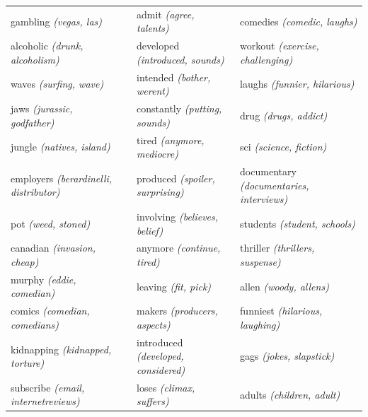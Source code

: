 \begin{landscape}
\begin{table}[]
\begin{tabular}{llll}
			gambling \textit{(vegas, las)}                 &                          & admit \textit{(agree, talents)}                  & comedies \textit{(comedic, laughs)}              \\
			alcoholic \textit{(drunk, alcoholism)}         &                          & developed \textit{(introduced, sounds)}          & workout \textit{(exercise, challenging)}         \\
			waves \textit{(surfing, wave)}                 &                          & intended \textit{(bother, werent)}               & laughs \textit{(funnier, hilarious)}             \\
			jaws \textit{(jurassic, godfather)}            &                          & constantly \textit{(putting, sounds)}            & drug \textit{(drugs, addict)}                    \\
			jungle \textit{(natives, island)}              &                          & tired \textit{(anymore, mediocre)}               & sci \textit{(science, fiction)}                  \\
			employers \textit{(berardinelli, distributor)} &                          & produced \textit{(spoiler, surprising)}          & documentary \textit{(documentaries, interviews)} \\
			pot \textit{(weed, stoned)}                    &                          & involving \textit{(believes, belief)}            & students \textit{(student, schools)}             \\
			canadian \textit{(invasion, cheap)}            &                          & anymore \textit{(continue, tired)}               & thriller \textit{(thrillers, suspense)}          \\
			murphy \textit{(eddie, comedian)}              &                          & leaving \textit{(fit, pick)}                     & allen \textit{(woody, allens)}                   \\
			comics \textit{(comedian, comedians)}          &                          & makers \textit{(producers, aspects)}             & funniest \textit{(hilarious, laughing)}          \\
			kidnapping \textit{(kidnapped, torture)}       &                          & introduced \textit{(developed, considered)}      & gags \textit{(jokes, slapstick)}                 \\
			subscribe \textit{(email, internetreviews)}    &                          & loses \textit{(climax, suffers)}                 & adults \textit{(children, adult)}                \\

\end{tabular}
\end{table}
\end{landscape}
